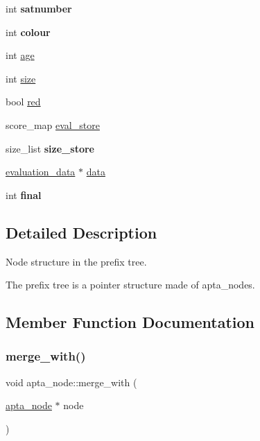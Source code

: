 \begin{DoxyCompactItemize}
int {\bfseries satnumber}
\item 
\mbox{\label{classapta__node_a71d29ce9c86f145bd4854a5262d73829}} 
int {\bfseries colour}
\item 
int \hyperlink{classapta__node_a24d4af165b37f04090c85df1ef3ac997}{age}
\item 
int \hyperlink{classapta__node_a24c9dae152b759bb6a2ebcae6bbc36d5}{size}
\item 
bool \hyperlink{classapta__node_ab5e461390057947fba0c8ec64b7fd57a}{red}
\item 
score\+\_\+map \hyperlink{classapta__node_a61b271696a3f73cb1b5c74a303542522}{eval\+\_\+store}
\item 
\mbox{\label{classapta__node_a0bd52815004e691c4fa942b262477c0a}} 
size\+\_\+list {\bfseries size\+\_\+store}
\item 
\hyperlink{classevaluation__data}{evaluation\+\_\+data} $\ast$ \hyperlink{classapta__node_a9b2762e845a7776004e7edab7dae8718}{data}
\item 
\mbox{\label{classapta__node_aface93dccd22779b562d6bf94641e36d}} 
int {\bfseries final}
\end{DoxyCompactItemize}


\subsection{Detailed Description}
Node structure in the prefix tree. 

The prefix tree is a pointer structure made of apta\+\_\+nodes. 

\subsection{Member Function Documentation}
\mbox{\label{classapta__node_aa7ad2ab5e24d47095eb7d7d60f2d1af4}} 
\subsubsection{\texorpdfstring{merge\+\_\+with()}{merge\_with()}}
{\footnotesize\ttfamily void apta\+\_\+node\+::merge\+\_\+with (\begin{DoxyParamCaption}\item[{\hyperlink{classapta__node}{apta\+\_\+node} $\ast$}]{node }\end{DoxyParamCaption})\hspace{0.3cm}{\ttfamily [inline]}}

